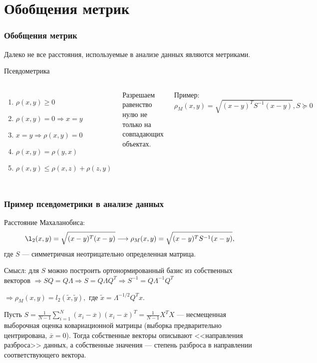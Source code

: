 \documentclass[10pt]{beamer}
\begin{document}
\section{Обобщения метрик} 
\begin{frame}
\frametitle{Обобщения метрик}

Далеко не все расстояния, используемые в анализе данных являются метриками.
\begin{block}{Псевдометрика}
\begin{columns}[c] %

\begin{enumerate}
	\item $\rho(x, y) \geqslant 0$
	\item \sout{$\rho(x, y) = 0 \Rightarrow x = y$}
	\item $x = y \Rightarrow \rho(x, y) = 0$
	\item $\rho(x, y) = \rho(y, x)$
	\item $\rho(x, y) \leqslant \rho(x, z) + \rho(z, y)$
\end{enumerate}

Разрешаем равенство нулю не только на совпадающих объектах.


Пример: $ \rho_{M}(x, y) = \sqrt{(x-y)^{T}S^{-1}(x-y)}, S\succeq 0$

\end{columns}
\end{block} 

\end{frame}



\begin{frame}
\frametitle{Пример псевдометрики в анализе данных}
	Расстояние Махаланобиса: 
	\[\l_{2}(x, y) = \sqrt{(x-y)^{T} (x-y)}\longrightarrow \rho_{M}(x, y) = \sqrt{(x-y)^{T}S^{-1}(x-y)},\]где $S$ — симметричная неотрицательно определенная матрица.

	\vspace{\baselineskip}
	Смысл: для $S$ можно построить ортонормированный базис из собственных векторов $\Rightarrow SQ = Q \Lambda \Rightarrow S = Q \Lambda Q^{T} \Rightarrow S^{-1}=Q \Lambda ^{-1} Q^ {T}$ 
	
	$\Rightarrow \rho_{M}(x, y) = l_{2}(\widetilde{x}, \widetilde{y}),$ где $\widetilde{x} = \Lambda ^{-1/2} Q^{T} x.$
	
	\vspace{\baselineskip}
	Пусть $S = \frac{1}{N-1} \sum\limits_{i = 1}^{N} (x_{i} - \overline{x})(x_{i} - \overline{x})^{T} =  \frac{1}{N - 1} X^{T} X$ --- несмещенная выборочная оценка ковариационной матрицы (выборка предварительно центрирована, $\overline{x} = 0$). Тогда собственные векторы описывают <<направления разброса>> данных, а собственные значения --- степень разброса в направлении соответствующего вектора.  
	
\end{frame}
\end{document}
